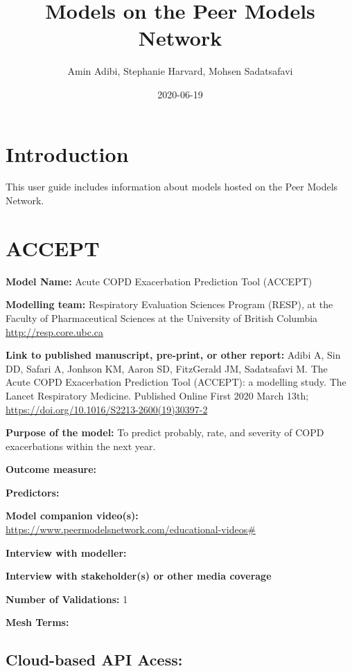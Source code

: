 \documentclass[
]{book}
\title{Models on the Peer Models Network}
\author{Amin Adibi, Stephanie Harvard, Mohsen Sadatsafavi}
\date{2020-06-19}
\begin{document}
\maketitle

{
\setcounter{tocdepth}{1}
\tableofcontents
}
\hypertarget{introduction}{%
\chapter{Introduction}\label{introduction}}

This user guide includes information about models hosted on the Peer Models Network.

\hypertarget{accept}{%
\chapter{ACCEPT}\label{accept}}

\textbf{Model Name:} Acute COPD Exacerbation Prediction Tool (ACCEPT)

\textbf{Modelling team:} Respiratory Evaluation Sciences Program (RESP), at the Faculty of Pharmaceutical Sciences at the University of British Columbia \url{http://resp.core.ubc.ca}

\textbf{Link to published manuscript, pre-print, or other report:} Adibi A, Sin DD, Safari A, Jonhson KM, Aaron SD, FitzGerald JM, Sadatsafavi M. The Acute COPD Exacerbation Prediction Tool (ACCEPT): a modelling study. The Lancet Respiratory Medicine. Published Online First 2020 March 13th; \href{doi:10.1016/S2213-2600(19)30397-2}{https://doi.org/10.1016/S2213-2600(19)30397-2}

\textbf{Purpose of the model:} To predict probably, rate, and severity of COPD exacerbations within the next year.

\textbf{Outcome measure:}

\textbf{Predictors:}

\textbf{Model companion video(s): }\href{The\%20ACCEPT\%20Model\%20in\%2090\%20Seconds}{https://www.peermodelsnetwork.com/educational-videos\#}

\textbf{Interview with modeller:}

\textbf{Interview with stakeholder(s) or other media coverage}

\textbf{Number of Validations:} 1

\textbf{Mesh Terms:}

\hypertarget{cloud-based-api-acess}{%
\section{Cloud-based API Acess:}\label{cloud-based-api-acess}}
\end{document}

